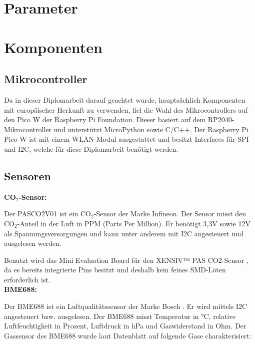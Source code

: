\begin{inhalt}
\renewcommand*\chapterpagestyle{scrheadings}

\section{Parameter}

\section{Komponenten}

\subsection{Mikrocontroller}

Da in dieser Diplomarbeit darauf geachtet wurde, hauptsächlich Komponenten mit europäischer Herkunft zu verwenden, fiel die Wahl des Mikrocontrollers auf den Pico W der Raspberry Pi Foundation. Dieser basiert auf dem RP2040-Mikrocontroller und unterstützt MicroPython sowie C/C++. Der Raspberry Pi Pico W ist mit einem WLAN-Modul ausgestattet und besitzt Interfaces für SPI und I2C, welche für diese Diplomarbeit benötigt werden. \cite{Raspberry_Pi_Pico_W}

\subsection{Sensoren}

\textbf{CO$_2$-Sensor:}

\smallskip

Der PASCO2V01 ist ein CO$_2$-Sensor der Marke Infineon. Der Sensor misst den CO$_2$-Anteil in der Luft in PPM (Parts Per Million). Er benötigt 3,3V sowie 12V als Spannungsversorgungen und kann unter anderem mit I2C angesteuert und ausgelesen werden. \cite{PASCO2V01}

Benutzt wird das Mini Evaluation Board für den XENSIV™ PAS CO2-Sensor \cite{PASCO2_Miniboard}, da es bereits integrierte Pins besitzt und deshalb kein feines SMD-Löten erforderlich ist. 
\bigskip \\

\textbf{BME688:}

\smallskip

Der BME688 ist ein Luftqualitätssensor der Marke Bosch \cite{BME688}. Er wird mittels I2C angesteuert bzw. ausgelesen. Der BME688 misst Temperatur in °C, relative Luftfeuchtigkeit in Prozent, Luftdruck in hPa und Gaswiderstand in Ohm. Der Gassensor des BME688 wurde laut Datenblatt auf folgende Gase charakterisiert:


\end{inhalt}
